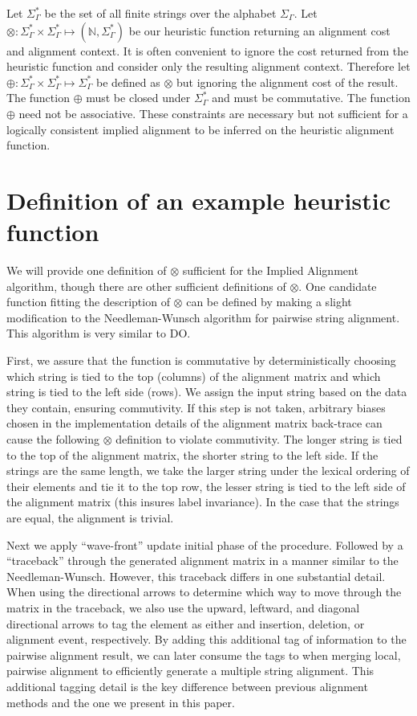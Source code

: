 \documentclass[11pt]{article}
\begin{document}
Let $\Sigma^{*}_{\Gamma}$ be the set of all finite strings over the alphabet $\Sigma_{\Gamma}$.
Let $\otimes \colon \Sigma^{*}_{\Gamma} \times \Sigma^{*}_{\Gamma} \mapsto \left(\mathbb{N}, \Sigma^{*}_{\Gamma}\right)$ be our heuristic function returning an alignment cost and alignment context.
It is often convenient to ignore the cost returned from the heuristic function and consider only the resulting alignment context. Therefore let $\oplus \colon \Sigma^{*}_{\Gamma} \times \Sigma^{*}_{\Gamma} \mapsto \Sigma^{*}_{\Gamma}$ be defined as $\otimes$ but ignoring the alignment cost of the result. 
The function $\oplus$ must be closed under $\Sigma^{*}_{\Gamma}$ and must be commutative. 
The function $\oplus$ need not be associative.
These constraints are necessary but not sufficient for a logically consistent implied alignment to be inferred on the heuristic alignment function.

\section{Definition of an example heuristic function}
We will provide one definition of $\otimes$ sufficient for the Implied Alignment algorithm, though there are other sufficient definitions of $\otimes$. 
One candidate function fitting the description of $\otimes$ can be defined by making a slight modification to the Needleman-Wunsch \citep{Needleman1970} algorithm for pairwise string alignment.
This algorithm is very similar to DO.

First, we assure that the function is commutative by deterministically choosing which string is tied to the top (columns) of the alignment matrix and which string is tied to the left side (rows). 
We assign the input string based on the data they contain, ensuring commutivity. If this step is not taken, arbitrary biases chosen in the implementation details of the alignment matrix back-trace can cause the following $\otimes$ definition to violate commutivity. 
The longer string is tied to the top of the alignment matrix, the shorter string to the left side. If the strings are the same length, we take the larger string under the lexical ordering of their elements and tie it to the top row, the lesser string is tied to the left side of the alignment matrix (this insures label invariance). 
In the case that the strings are equal, the alignment is trivial.

Next we apply ``wave-front'' update initial phase of the procedure. Followed by a ``traceback'' through the generated alignment matrix in a manner similar to the Needleman-Wunsch. 
However, this traceback differs in one substantial detail. When using the directional arrows to determine which way to move through the matrix in the traceback, we also use the upward, leftward, and diagonal directional arrows to tag the element as either and insertion, deletion, or alignment event, respectively. 
By adding this additional tag of information to the pairwise alignment result, we can later consume the tags to when merging local, pairwise alignment to efficiently generate a multiple string alignment.
This additional tagging detail is the key difference between previous alignment methods and the one we present in this paper.
\end{document}
